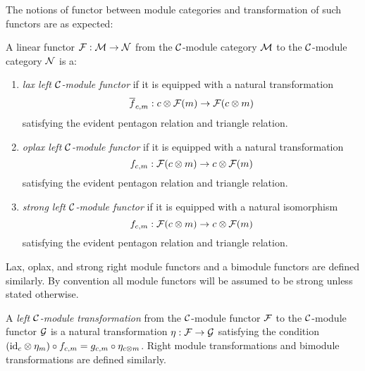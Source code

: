 \documentclass{amsart}
\begin{document}
The notions of functor between module categories and transformation of such functors are as expected:
\begin{definition}
A linear functor $\mathcal F: \mathcal M \rightarrow \mathcal N$ from the $\mathcal C$-module category $\mathcal M$ to the $\mathcal C$-module category $\mathcal N$ is a:
\begin{enumerate}
	\item \emph{lax left $\mathcal C$-module functor} if it is equipped with a natural transformation 
	\begin{equation*}
		\overline{f}_{c,m}:c \otimes \mathcal F(m) \rightarrow \mathcal F(c \otimes m)
	\end{equation*}
	 satisfying the evident pentagon relation and triangle relation.
	\item \emph{oplax left $\mathcal C$-module functor} if it is equipped with a natural transformation 
	\begin{equation*}
		f_{c,m}:\mathcal F(c \otimes m) \rightarrow c \otimes \mathcal F(m)
	\end{equation*}
	satisfying the evident pentagon relation and triangle relation.
	\item \emph{strong left $\mathcal C$-module functor} if it is equipped with a natural isomorphism 
	\begin{equation*}
		f_{c,m}:\mathcal F(c \otimes m) \rightarrow c \otimes \mathcal F(m)
	\end{equation*}
	satisfying the evident pentagon relation and triangle relation.
\end{enumerate} 
Lax, oplax, and strong right module functors and a bimodule functors are defined similarly. By convention all module functors will be assumed to be strong unless stated otherwise. 
\end{definition}


\begin{definition}
A \emph{left $\mathcal C$-module transformation} from the $\mathcal C$-module functor $\mathcal F$ to the $\mathcal C$-module functor $\mathcal G$ is a natural transformation $\eta: \mathcal F \rightarrow \mathcal G$ satisfying the condition $(\mathrm{id}_c \otimes \eta_m) \circ f_{c,m} = g_{c,m} \circ \eta_{c \otimes m}$.  Right module transformations and bimodule transformations are defined similarly.
\end{definition}
\end{document}

